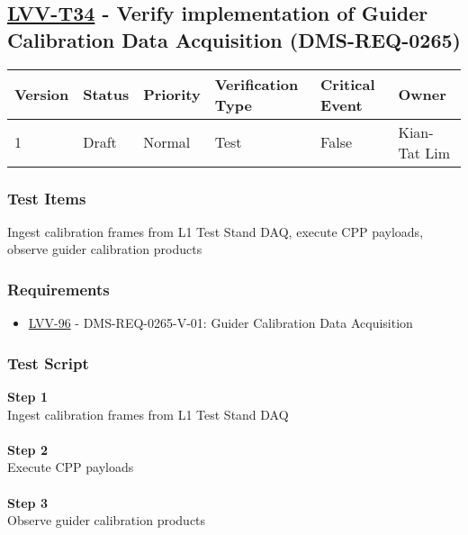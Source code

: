 \hypertarget{lvv-t34---verify-implementation-of-guider-calibration-data-acquisition-dms-req-0265}{%
\subsection{\texorpdfstring{\href{https://jira.lsstcorp.org/secure/Tests.jspa\#/testCase/LVV-T34}{LVV-T34}
- Verify implementation of Guider Calibration Data Acquisition
(DMS-REQ-0265)}{LVV-T34 - Verify implementation of Guider Calibration Data Acquisition (DMS-REQ-0265)}}\label{lvv-t34---verify-implementation-of-guider-calibration-data-acquisition-dms-req-0265}}

\begin{longtable}[]{@{}llllll@{}}
\toprule
Version & Status & Priority & Verification Type & Critical Event &
Owner\tabularnewline
\midrule
\endhead
1 & Draft & Normal & Test & False & Kian-Tat Lim\tabularnewline
\bottomrule
\end{longtable}

\hypertarget{test-items-10}{%
\subsubsection{Test Items}\label{test-items-10}}

{Ingest calibration frames from L1 Test Stand DAQ, execute CPP payloads,
observe guider calibration products}

\hypertarget{requirements-11}{%
\subsubsection{Requirements}\label{requirements-11}}

\begin{itemize}
\tightlist
\item
  \href{https://jira.lsstcorp.org/browse/LVV-96}{LVV-96} -
  DMS-REQ-0265-V-01: Guider Calibration Data Acquisition
\end{itemize}

\hypertarget{test-script-11}{%
\subsubsection{Test Script}\label{test-script-11}}

\textbf{Step 1}\\
{Ingest calibration frames from L1 Test Stand DAQ}\\
~\\
\textbf{Step 2}\\
Execute CPP payloads\\
~\\
\textbf{Step 3}\\
Observe guider calibration products\\
~\\

